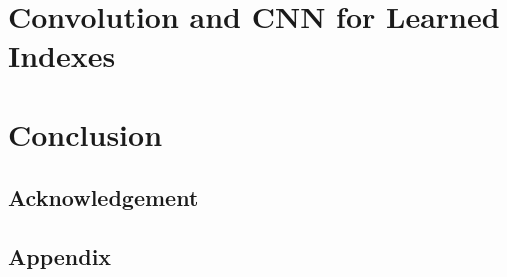 \documentclass[a4paper,12pt]{scrreprt}
\begin{document}


\chapter{Convolution and CNN for Learned Indexes}



\chapter{Conclusion}

\section*{Acknowledgement}



\begin{appendices}
\chapter{Appendix}
\end{appendices}





\end{document}
